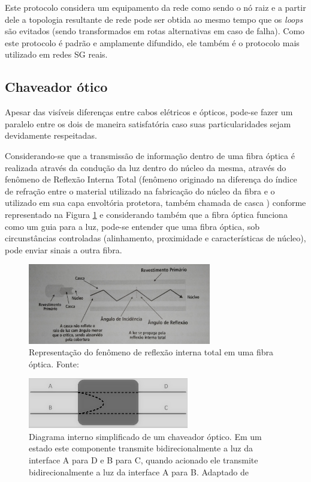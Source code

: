 \documentclass[12pt]{article}
\begin{document}
Este protocolo considera um equipamento da rede como sendo o nó raiz e a partir dele a topologia resultante de rede pode ser obtida ao mesmo tempo que os \emph{loops} são evitados (sendo transformados em rotas alternativas em caso de falha). Como este protocolo é padrão e amplamente difundido, ele também é o protocolo mais utilizado em redes SG reais.

\subsection{Chaveador ótico}
Apesar das visíveis diferenças entre cabos elétricos e ópticos, pode-se fazer um paralelo entre os dois de maneira satisfatória caso suas particularidades sejam devidamente respeitadas. 

Considerando-se que a transmissão de informação dentro de uma fibra óptica é realizada através da condução da luz dentro do núcleo da mesma, através do fenômeno de Reflexão Interna Total (fenômeno originado na diferença do índice de refração entre o material utilizado
na fabricação do núcleo da fibra e o utilizado em sua capa envoltória protetora, também chamada de casca \cite{inbook_data_cabling}) conforme representado na Figura \ref{fig_fibra_optica} e considerando  também que a fibra óptica funciona como um guia para a luz, pode-se entender que uma fibra óptica, sob circunstâncias controladas (alinhamento, proximidade e características de núcleo), pode enviar sinais a outra fibra. 

\begin{figure} %
	\centering
	\includegraphics[width=8cm]{fibra_optica}
	\caption{Representação do fenômeno de reflexão interna total em uma fibra óptica. Fonte: \cite{inbook_data_cabling}}
	\label{fig_fibra_optica}
\end{figure}

\begin{figure} [h]%
	\centering
	\includegraphics[width=7cm]{Switch_optico}
	\caption{Diagrama interno simplificado de um chaveador óptico. Em um estado este componente transmite bidirecionalmente a luz da interface A para D e B para C, quando acionado ele transmite bidirecionalmente a luz da interface A para B. Adaptado de \cite{Accelink2014}}
	\label{fig_switch_optico}
\end{figure}
\end{document}
